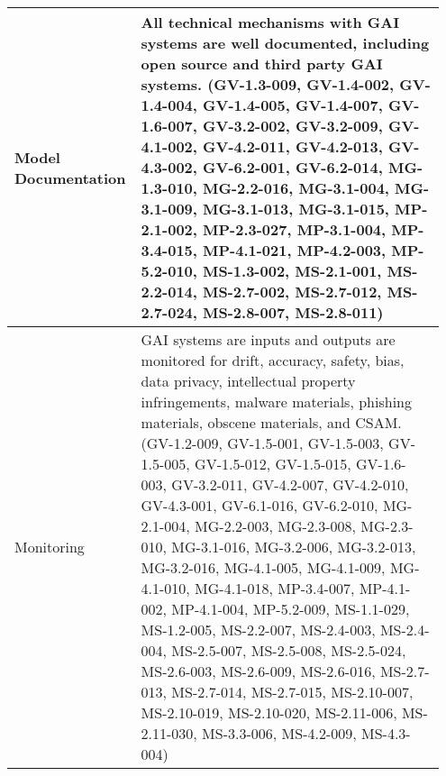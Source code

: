 \documentclass[fleqn]{article}
\begin{document}
\begin{table}[H]
\begin{tabular}{|m{0.25\linewidth} |m{0.70\linewidth} |}
		\hline
		Model Documentation & All technical mechanisms with GAI systems are well documented, including open source and third party GAI systems. (GV-1.3-009, GV-1.4-002, GV-1.4-004, GV-1.4-005, GV-1.4-007, GV-1.6-007, GV-3.2-002, GV-3.2-009, GV-4.1-002, GV-4.2-011, GV-4.2-013, GV-4.3-002, GV-6.2-001, GV-6.2-014, MG-1.3-010, MG-2.2-016, MG-3.1-004, MG-3.1-009, MG-3.1-013, MG-3.1-015, MP-2.1-002, MP-2.3-027, MP-3.1-004, MP-3.4-015, MP-4.1-021, MP-4.2-003, MP-5.2-010, MS-1.3-002, MS-2.1-001, MS-2.2-014, MS-2.7-002, MS-2.7-012, MS-2.7-024, MS-2.8-007, MS-2.8-011) \\ 
		\hline
		Monitoring & GAI systems are inputs and outputs are monitored for drift, accuracy, safety, bias, data privacy, intellectual property infringements, malware materials, phishing materials, obscene materials, and CSAM. (GV-1.2-009, GV-1.5-001, GV-1.5-003, GV-1.5-005, GV-1.5-012, GV-1.5-015, GV-1.6-003, GV-3.2-011, GV-4.2-007, GV-4.2-010, GV-4.3-001, GV-6.1-016, GV-6.2-010, MG-2.1-004, MG-2.2-003, MG-2.3-008, MG-2.3-010, MG-3.1-016, MG-3.2-006, MG-3.2-013, MG-3.2-016, MG-4.1-005, MG-4.1-009, MG-4.1-010, MG-4.1-018, MP-3.4-007, MP-4.1-002, MP-4.1-004, MP-5.2-009, MS-1.1-029, MS-1.2-005, MS-2.2-007, MS-2.4-003, MS-2.4-004, MS-2.5-007, MS-2.5-008, MS-2.5-024, MS-2.6-003, MS-2.6-009, MS-2.6-016, MS-2.7-013, MS-2.7-014, MS-2.7-015, MS-2.10-007, MS-2.10-019, MS-2.10-020, MS-2.11-006, MS-2.11-030, MS-3.3-006, MS-4.2-009, MS-4.3-004) \\ 
		\hline
	\end{tabular}
\end{table}	
\pagebreak		
	
\end{document}
